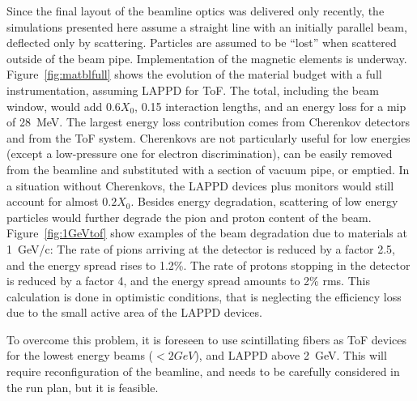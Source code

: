 Since the final layout of the beamline optics was delivered only recently, the simulations presented here assume a straight line with an initially parallel beam, deflected only by scattering. Particles are assumed to be ``lost'' when scattered outside of the beam pipe. Implementation of the magnetic elements is underway.
 Figure~\ref{fig:matblfull} shows the evolution of the material budget with a full instrumentation, assuming LAPPD for ToF. The total, including the beam window, would add $0.6X_0$, 0.15 interaction lengths, and an energy loss for a mip of 28~MeV.
The largest energy loss contribution comes from Cherenkov detectors and from the  ToF system. Cherenkovs are not particularly useful for low energies (except a low-pressure one for electron discrimination), can be easily removed from the beamline and substituted with a section of vacuum pipe, or emptied.  
In a situation without Cherenkovs, the LAPPD devices plus monitors would still account for almost  $0.2X_0$. Besides energy degradation, scattering of low energy particles would  further degrade the pion and proton content of the beam.  Figure~\ref{fig:1GeVtof} show examples of the beam degradation due to materials at 1~GeV/c: The rate of pions arriving at the detector is reduced by a factor 2.5, and the energy spread rises to 1.2\%. The rate of protons stopping in the detector is reduced by a factor 4, and the energy spread amounts to 2\% rms. This calculation is done in optimistic conditions, that is neglecting the efficiency loss due to the small active area of the LAPPD devices.

To overcome this problem, it is foreseen to   use  scintillating fibers as ToF devices for the lowest energy beams ($< 2 GeV$), and LAPPD above 2~GeV.
   This will require reconfiguration of the beamline, and needs to be carefully considered in the run plan, but it is feasible.  
 



